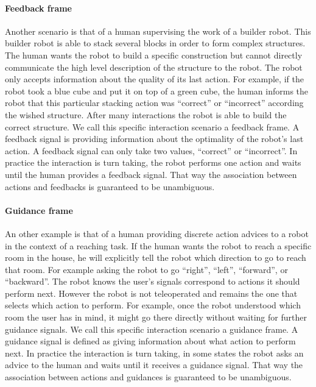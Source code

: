 \paragraph{Feedback frame}
Another scenario is that of a human supervising the work of a builder robot. This builder robot is able to stack several blocks in order to form complex structures. The human wants the robot to build a specific construction but cannot directly communicate the high level description of the structure to the robot. The robot only accepts information about the quality of its last action. For example, if the robot took a blue cube and put it on top of a green cube, the human informs the robot that this particular stacking action was ``correct'' or ``incorrect'' according the wished structure. After many interactions the robot is able to build the correct structure. We call this specific interaction scenario a feedback frame. A feedback signal is providing information about the optimality of the robot's last action. A feedback signal can only take two values, ``correct'' or ``incorrect''. In practice the interaction is turn taking, the robot performs one action and waits until the human provides a feedback signal. That way the association between actions and feedbacks is guaranteed to be unambiguous.

\paragraph{Guidance frame} An other example is that of a human providing discrete action advices to a robot in the context of a reaching task. If the human wants the robot to reach a specific room in the house, he will explicitly tell the robot which direction to go to reach that room. For example asking the robot to go ``right'', ``left'', ``forward'', or ``backward''. The robot knows the user's signals correspond to actions it should perform next. However the robot is not teleoperated and remains the one that selects which action to perform. For example, once the robot understood which room the user has in mind, it might go there directly without waiting for further guidance signals. We call this specific interaction scenario a guidance frame. A guidance signal is defined as giving information about what action to perform next. In practice the interaction is turn taking, in some states the robot asks an advice to the human and waits until it receives a guidance signal. That way the association between actions and guidances is guaranteed to be unambiguous.


